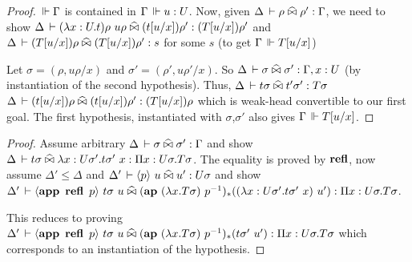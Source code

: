 \documentclass[a4paper,english]{lipics-utf8x}
\begin{document}
  \begin{proof}
    $\,\Vdash \Gamma$ is contained in $\Gamma \,\Vdash u : U$.
    Now, given $\Delta \,\vdash \rho \mathrel{\widehat{\bowtie}} \rho' : \Gamma$, we need to show
    $\Delta \,\vdash (\lambda x:U.t)\rho\ u\rho \mathrel{\widehat{\bowtie}} (t[u/x])\rho' : (T[u/x])\rho'$
    and $\Delta \,\vdash (T[u/x])\rho \mathrel{\widehat{\bowtie}} (T[u/x])\rho' : s$ for some $s$
    (to get $\Gamma \,\Vdash T[u/x]$)

    Let $\sigma = (\rho, u \rho/x)$ and $\sigma' = (\rho', u \rho'/x)$.
    So $\Delta \,\vdash \sigma \mathrel{\widehat{\bowtie}} \sigma' : \Gamma, x:U$ (by instantiation of the
    second hypothesis).
    Thus, $\Delta \,\vdash t \sigma \mathrel{\widehat{\bowtie}} t' \sigma' : T\sigma$
    \ie $\Delta \,\vdash (t[u/x])\rho \mathrel{\widehat{\bowtie}} (t[u/x])\rho' : (T[u/x])\rho$
    which is weak-head convertible to our first goal.
    The first hypothesis, instantiated with $\sigma$,$\sigma'$ also gives
    $\Gamma \,\Vdash T[u/x]$.
  \end{proof}

  \begin{lemma}
    \leavevmode
    \begin{mathc}
    \end{mathc}
  \end{lemma}

  \begin{proof}
    Assume arbitrary $\Delta \,\vdash \sigma \mathrel{\widehat{\bowtie}} \sigma' : \Gamma$ and show
    $\Delta \,\vdash t \sigma \mathrel{\widehat{\bowtie}} \lambda x:U\sigma'. t\sigma'\ x :
    \Pi x:U\sigma.T\sigma$.
    The equality is proved by $\operatorname{\mathbf{refl}}$, now assume $\Delta' \le \Delta$
    and $\Delta' \,\vdash \langle p \rangle~ u \mathrel{\widehat{\bowtie}} u' : U\sigma$ and show
    $\Delta' \der \hideq{\app \refl\ p} t\sigma\ u \hEr
    (\ap (\lambda x.T\sigma)\ p\inv)_* ((\lambda x:U\sigma'. t\sigma'\ x)\ u') :
    \Pi x:U\sigma.T\sigma$.

    This reduces to proving
    $\Delta' \,\vdash \langle \operatorname{\mathbf{app}~} \operatorname{\mathbf{refl}}\ p \rangle~ t\sigma\ u \mathrel{\widehat{\bowtie}}
    (\operatorname{\mathbf{ap}~} (\lambda x.T\sigma)\ p^{-1})_* (t \sigma'\ u') :
    \Pi x:U\sigma.T\sigma$ which corresponds to an instantiation of
    the hypothesis.
  \end{proof}

  \begin{lemma}
    \leavevmode
    \begin{mathc}
    \end{mathc}
  \end{lemma}
\end{document}
